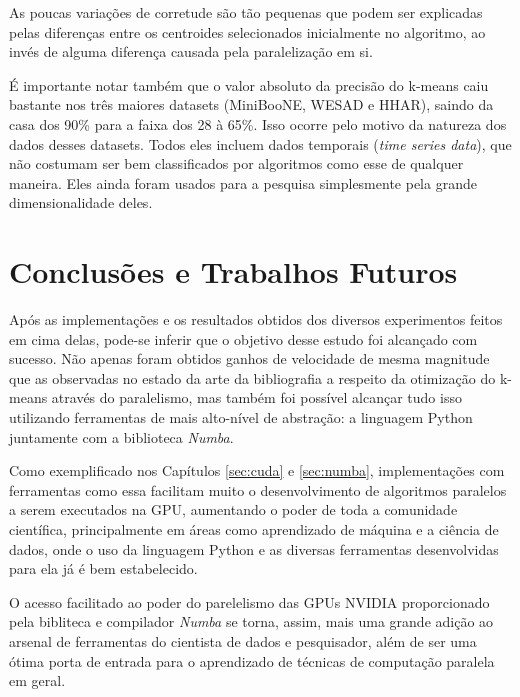\documentclass[12pt,
openright, 
oneside, %
a4paper,    %
brazil]{facom-ufu-abntex2}
\begin{document}
As poucas variações de corretude são tão pequenas que podem ser explicadas pelas diferenças entre os centroides selecionados inicialmente no algoritmo, ao invés de alguma diferença causada pela paralelização em si.

É importante notar também que o valor absoluto da precisão do k-means caiu bastante nos três maiores datasets (MiniBooNE, WESAD e HHAR), saindo da casa dos 90\% para a faixa dos 28 à 65\%. Isso ocorre pelo motivo da natureza dos dados desses datasets. Todos eles incluem dados temporais (\textit{time series data}), que não costumam ser bem classificados por algoritmos como esse de qualquer maneira. Eles ainda foram usados para a pesquisa simplesmente pela grande dimensionalidade deles.






\chapter{Conclusões e Trabalhos Futuros}
\label{chp:conclusões}

Após as implementações e os resultados obtidos dos diversos experimentos feitos em cima delas, pode-se inferir que o objetivo desse estudo foi alcançado com sucesso. Não apenas foram obtidos ganhos de velocidade de mesma magnitude que as observadas no estado da arte da bibliografia a respeito da otimização do k-means através do paralelismo, mas também foi possível alcançar tudo isso utilizando ferramentas de mais alto-nível de abstração: a linguagem Python juntamente com a biblioteca \textit{Numba}.

Como exemplificado nos Capítulos \ref{sec:cuda} e \ref{sec:numba}, implementações com ferramentas como essa facilitam muito o desenvolvimento de algoritmos paralelos a serem executados na GPU, aumentando o poder de toda a comunidade científica, principalmente em áreas como  aprendizado de máquina e a ciência de dados, onde o uso da linguagem Python e as diversas ferramentas desenvolvidas para ela já é bem estabelecido.

O acesso facilitado ao poder do parelelismo das GPUs NVIDIA proporcionado pela bibliteca e compilador \textit{Numba} se torna, assim, mais uma grande adição ao arsenal de ferramentas do cientista de dados e pesquisador, além de ser uma ótima porta de entrada para o aprendizado de técnicas de computação paralela em geral.
\end{document}
